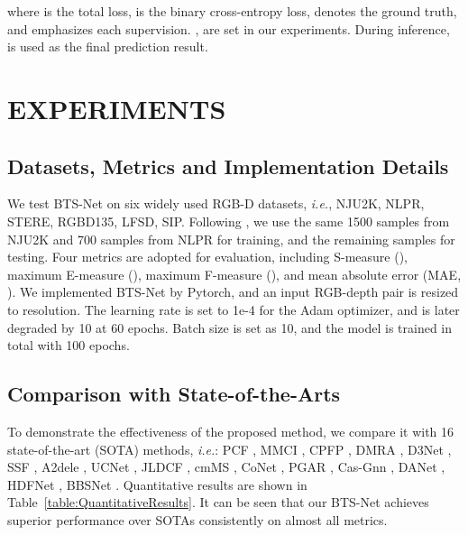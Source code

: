 \documentclass{article}
\begin{document}
where  is the total loss,  is the binary cross-entropy loss,  denotes the ground truth, and  emphasizes each supervision. ,  are set in our experiments. During inference,  is used as the final prediction result. 





\section{EXPERIMENTS}
\vspace{-0.2cm}
\subsection{Datasets, Metrics and Implementation Details}\vspace{-0.2cm}
We test BTS-Net on six widely used RGB-D datasets, \emph{i.e.}, NJU2K, NLPR, STERE, RGBD135, LFSD, SIP. Following \cite{JLDCF,UCNet,CPFP}, we use the same 1500 samples from NJU2K and 700 samples from NLPR for training, and the remaining samples for testing. Four metrics are adopted for evaluation, including S-measure (), maximum E-measure (), maximum F-measure (), and mean absolute error (MAE, ).
We implemented BTS-Net by Pytorch, and an input RGB-depth pair is resized to  resolution. The learning rate is set to 1e-4 for the Adam optimizer, and is later degraded by 10 at 60 epochs. Batch size is set as 10, and the model is trained in total with 100 epochs. \vspace{-0.2cm}
\subsection{Comparison with State-of-the-Arts}\vspace{-0.2cm}
    To demonstrate the effectiveness of the proposed method, we compare it with 16 state-of-the-art (SOTA) methods, \emph{i.e.}: PCF \cite{PCF}, MMCI \cite{MMCI}, CPFP \cite{CPFP}, DMRA \cite{DRMA}, D3Net \cite{D3Net}, SSF \cite{SSF}, A2dele \cite{A2dele}, UCNet \cite{UCNet}, JLDCF \cite{JLDCF}, cmMS \cite{cmMS}, CoNet \cite{CoNet}, PGAR \cite{PGAR}, Cas-Gnn \cite{Cas-Gnn}, DANet \cite{DANet}, HDFNet \cite{HDFNet}, BBSNet \cite{BBSNet}. Quantitative results are shown in Table~\ref{table:QuantitativeResults}. It can be seen that our BTS-Net achieves superior performance over SOTAs consistently on almost all metrics.
   
\end{document}
